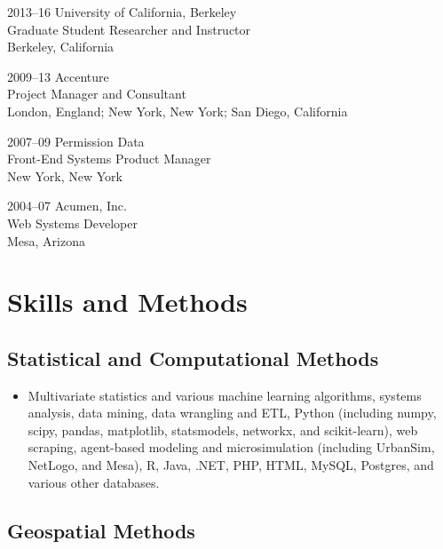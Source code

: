 \documentclass{academiccv}
\begin{document}
\begin{tablist}
\item[2013--16] \tab University of California, Berkeley \\
                     Graduate Student Researcher and Instructor \\
                     Berkeley, California

\item[2009--13] \tab Accenture \\
                     Project Manager and Consultant \\
                     London, England; New York, New York; San Diego, California

\item[2007--09] \tab Permission Data \\
                     Front-End Systems Product Manager \\
                     New York, New York

\item[2004--07] \tab Acumen, Inc. \\
                     Web Systems Developer \\
                     Mesa, Arizona
\end{tablist}



\section*{Skills and Methods}

\subsection*{Statistical and Computational Methods}

\begin{itemize}
\item Multivariate statistics and various machine learning algorithms, systems analysis, data mining, data wrangling and ETL, Python (including numpy, scipy, pandas, matplotlib, statsmodels, networkx, and scikit-learn), web scraping, agent-based modeling and microsimulation (including UrbanSim, NetLogo, and Mesa), R, Java, .NET, PHP, HTML, MySQL, Postgres, and various other databases.
\end{itemize}

\subsection*{Geospatial Methods}
\end{document}
